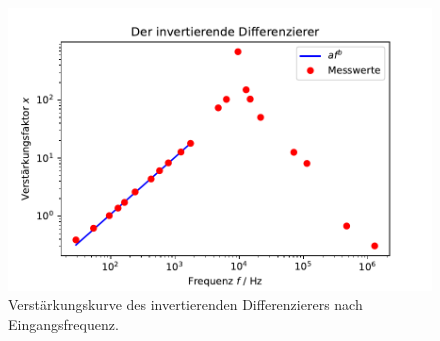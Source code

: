   \begin{figure}
    \centering
    \includegraphics{content/grafiken/invdifferenzierer.pdf}
    \caption{Verstärkungskurve des invertierenden Differenzierers nach Eingangsfrequenz.}
    \label{fig:invdifferenzierer}
  \end{figure}

